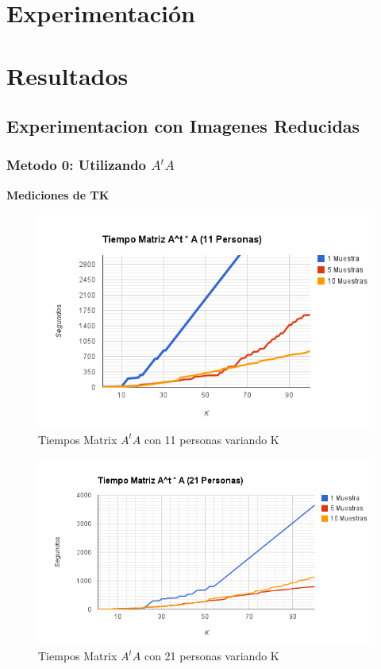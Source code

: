 \section{Experimentación}


\section{Resultados}
\subsection{Experimentacion con Imagenes Reducidas}
\subsubsection{Metodo 0: Utilizando $A^tA$}

\textbf{Mediciones de TK}
\begin{figure}[H]
\includegraphics[width=1\textwidth]{img/image1.png}
     \caption{Tiempos Matrix $A^tA$ con 11 personas variando K}
     \label{fig:figura1}
\end{figure}

\begin{figure}[H]
\includegraphics[width=1\textwidth]{img/image2.png}
     \caption{Tiempos Matrix $A^tA$ con 21 personas variando K}
     \label{fig:figura1}
\end{figure}

